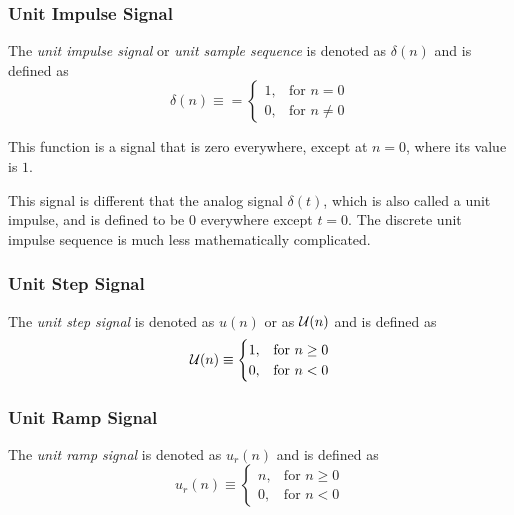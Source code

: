 \subsubsection{Unit Impulse Signal}\label{subsubsec:Unit Impulse Signal}
\begin{definition}\label{def:Unit Impulse Signal}
  The \emph{unit impulse signal} or \emph{unit sample sequence} is denoted as $\delta(n)$ and is defined as
  \begin{equation}\label{eq:Unit Impulse Signal}
    \delta(n) \equiv = \begin{cases}
      1, & \text{for } n = 0 \\
      0, & \text{for } n \neq 0
    \end{cases}
  \end{equation}

  This function is a signal that is zero everywhere, except at $n=0$, where its value is $1$.

  \begin{remark}
    This signal is different that the analog signal $\delta (t)$, which is also called a unit impulse, and is defined to be 0 everywhere except $t=0$.
    The discrete unit impulse sequence is much less mathematically complicated.
  \end{remark}
\end{definition}

\subsubsection{Unit Step Signal}\label{subsubsec:Unit Step Signal}
\begin{definition}\label{def:Unit Step Signal}
  The \emph{unit step signal} is denoted as $u(n)$ or as $\operatorname{\mathcal{U}}(n)$ and is defined as
  \begin{equation}\label{eq:Unit Step Signal}
    \operatorname{\mathcal{U}}(n) \equiv \begin{cases}
      1, & \text{for } n \geq 0 \\
      0, & \text{for } n < 0
    \end{cases}
  \end{equation}
\end{definition}

\subsubsection{Unit Ramp Signal}\label{subsubsec:Unit Ramp Signal}
\begin{definition}\label{def:Unit Ramp Signal}
  The \emph{unit ramp signal} is denoted as $u_{r}(n)$ and is defined as
  \begin{equation}\label{eq:Unit Ramp Signal}
    u_{r}(n) \equiv \begin{cases}
      n, & \text{for } n \geq 0 \\
      0, & \text{for } n < 0
    \end{cases}
  \end{equation}
\end{definition}

